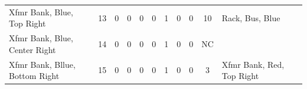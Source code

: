 \begin{table}[!htp]
{\begin{tabular}{lcccccccccll}
			Xfmr Bank, Blue, Top Right                          & 13                      & 0                                           & 0                                          & 0           & 0           & 1            & 0                & 0 & 10                           & Rack, Bus, Blue                  &                \\
			Xfmr Bank, Blue, Center Right                       & 14                      & 0                                           & 0                                          & 0           & 0           & 1            & 0                & 0 & NC                           &                                  &                \\
			Xfmr Bank, Bllue, Bottom Right                      & 15                      & 0                                           & 0                                          & 0           & 0           & 1            & 0                & 0 & 3                            & Xfmr Bank, Red, Top Right        &                \\ \bottomrule
		\end{tabular}
	}
\end{table}
